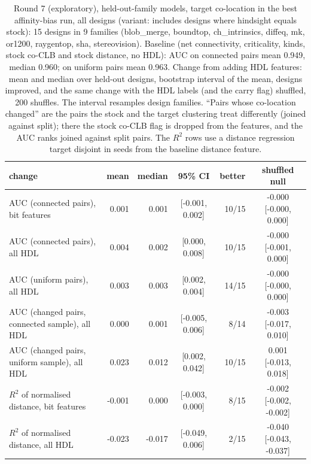\begin{table}[t]
\caption{Round 7 (exploratory), held-out-family models, target co-location in the best affinity-bias run, all designs (variant: includes designs where hindsight equals stock): 15 designs in 9 families (blob\_merge, boundtop, ch\_intrinsics, diffeq, mk, or1200, raygentop, sha, stereovision). Baseline (net connectivity, criticality, kinds, stock co-CLB and stock distance, no HDL): AUC on connected pairs mean 0.949, median 0.960; on uniform pairs mean 0.963. Change from adding HDL features: mean and median over held-out designs, bootstrap interval of the mean, designs improved, and the same change with the HDL labels (and the carry flag) shuffled, 200 shuffles. The interval resamples design families. ``Pairs whose co-location changed'' are the pairs the stock and the target clustering treat differently (joined against split); there the stock co-CLB flag is dropped from the features, and the AUC ranks joined against split pairs. The $R^2$ rows use a distance regression target disjoint in seeds from the baseline distance feature.}
\label{tab:r7modelaffall}
\centering\scriptsize
\begin{tabular}{@{}lrrcrc@{}}
\toprule
change & mean & median & 95\% CI & better & shuffled null \\
\midrule
AUC (connected pairs), bit features & 0.001 & 0.001 & [-0.001, 0.002] & 10/15 & -0.000 [-0.000, 0.000] \\
AUC (connected pairs), all HDL & 0.004 & 0.002 & [0.000, 0.008] & 10/15 & -0.000 [-0.001, 0.000] \\
AUC (uniform pairs), all HDL & 0.003 & 0.003 & [0.002, 0.004] & 14/15 & -0.000 [-0.000, 0.000] \\
AUC (changed pairs, connected sample), all HDL & 0.000 & 0.001 & [-0.005, 0.006] & 8/14 & -0.003 [-0.017, 0.010] \\
AUC (changed pairs, uniform sample), all HDL & 0.023 & 0.012 & [0.002, 0.042] & 10/15 & 0.001 [-0.013, 0.018] \\
$R^2$ of normalised distance, bit features & -0.001 & 0.000 & [-0.003, 0.000] & 8/15 & -0.002 [-0.002, -0.002] \\
$R^2$ of normalised distance, all HDL & -0.023 & -0.017 & [-0.049, 0.006] & 2/15 & -0.040 [-0.043, -0.037] \\
\bottomrule
\end{tabular}
\end{table}

